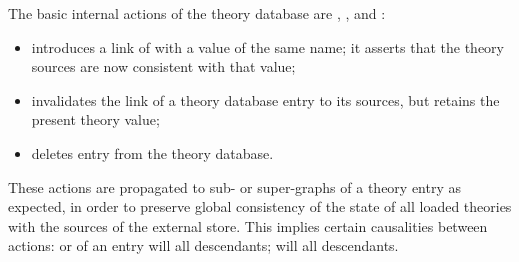 \begin{isabellebody}
\begin{isamarkuptext}
  The basic internal actions of the theory database are , , and :

  \begin{itemize}

  \item {} introduces a link of  with a
   value of the same name; it asserts that the theory
  sources are now consistent with that value;

  \item {} invalidates the link of a theory database
  entry to its sources, but retains the present theory value;

  \item {} deletes entry  from the theory
  database.
  
  \end{itemize}

  These actions are propagated to sub- or super-graphs of a theory
  entry as expected, in order to preserve global consistency of the
  state of all loaded theories with the sources of the external store.
  This implies certain causalities between actions: 
  or  of an entry will  all
  descendants;  will  all descendants.


\end{isamarkuptext}
\end{isabellebody}
